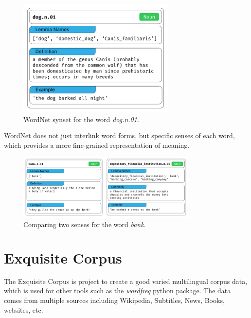 \begin{figure}
    \centering
    \includegraphics[width=0.7\textwidth]{figures/wordnet_single_synset.png}
    \caption{WordNet synset for the word \textit{dog.n.01}.}
    \label{fig:wordnet_single_synset}
\end{figure}

WordNet does not just interlink word forms, but specific senses of each word, which provides a more fine-grained representation of meaning.

\begin{figure}
    \centering
    \includegraphics[width=0.8\textwidth]{figures/wordnet_multiple_synset.png}
    \caption{Comparing two senses for the word \textit{bank}.}
    \label{fig:wordnet_multiple_synset}
\end{figure}

\section{Exquisite Corpus}
The Exquisite Corpus \cite{LuminosoInsightExquisitecorpus2025} is project to create a good varied multilingual corpus data, which is used for 
other tools such as the \textit{wordfreq} python package. The data comes from multiple sources including Wikipedia, Subtitles, News, Books, websites, etc.
